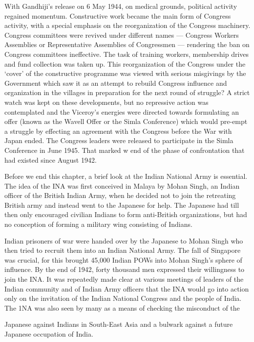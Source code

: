 \begin{multicols}{2}
With Gandhiji's release on 6 May 1944, on medical grounds, political activity regained momentum. Constructive work became the main form of Congress activity, with a special emphasis on the reorganization of the Congress machinery. Congress committees were revived under different names --- Congress Workers Assemblies or Representative Assemblies of Congressmen --- rendering the ban on Congress committees ineffective. The task of training workers, membership drives and fund collection was taken up. This reorganization of the Congress under the `cover' of the constructive programme was viewed with serious misgivings by the Government which saw it as an attempt to rebuild Congress influence and organization in the villages in preparation for the next round of struggle? A strict watch was kept on these developments, but no repressive action was contemplated and the Viceroy's energies were directed towards formulating an offer (known as the Wavell Offer or the Simla Conference) which would pre-empt a struggle by effecting an agreement with the Congress before the War with Japan ended. The Congress leaders were released to participate in the Simla Conference in June 1945. That marked w end of the phase of confrontation that had existed since August 1942.

Before we end this chapter, a brief look at the Indian National Army is essential. The idea of the INA was first conceived in Malaya by Mohan Singh, an Indian officer of the British Indian Army, when he decided not to join the retreating British army and instead went to the Japanese for help. The Japanese had till then only encouraged civilian Indians to form anti-British organizations, but had no conception of forming a military wing consisting of Indians.

Indian prisoners of war were handed over by the Japanese to Mohan Singh who then tried to recruit them into an Indian National Army. The fall of Singapore was crucial, for this brought 45,000 Indian POWs into Mohan Singh's sphere of influence. By the end of 1942, forty thousand men expressed their willingness to join the INA. It was repeatedly made clear at various meetings of leaders of the Indian community and of Indian Army officers that the INA would go into action only on the invitation of the Indian National Congress and the people of India. The 1NA was also seen by many as a means of checking the misconduct of the

Japanese against Indians in South-East Asia and a bulwark against a future Japanese occupation of India.


\end{multicols}
